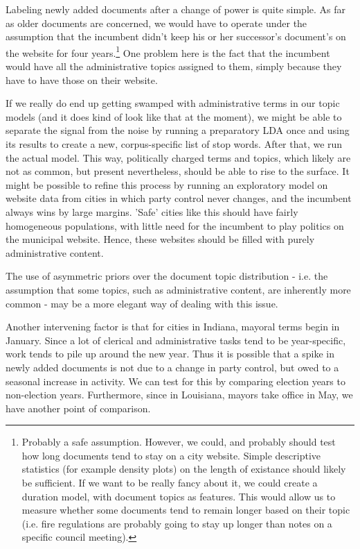 \documentclass[11pt]{article}
\begin{document}
Labeling newly added documents after a change of power is quite simple. As far as older documents are concerned, we would have to operate under the assumption that the incumbent didn't keep his or her successor's document's on the website for four years.\footnote{Probably a safe assumption. However, we could, and probably should test how long documents tend to stay on a city website. Simple descriptive statistics (for example density plots) on the length of existance should likely be sufficient. If we want to be really fancy about it, we could create a duration model, with document topics as features. This would allow us to measure whether some documents tend to remain longer based on their topic (i.e. fire regulations are probably going to stay up longer than notes on a specific council meeting).} One problem here is the fact that the incumbent would have all the administrative topics assigned to them, simply because they have to have those on their website.

If we really do end up getting swamped with administrative terms in our topic models (and it does kind of look like that at the moment), we might be able to separate the signal from the noise by running a preparatory LDA once and using its results to create a new, corpus-specific list of stop words. After that, we run the actual model. This way, politically charged terms and topics, which likely are not as common, but present nevertheless, should be able to rise to the surface. It might be possible to refine this process by running an exploratory model on website data from cities in which party control never changes, and the incumbent always wins by large margins. 'Safe' cities like this should have fairly homogeneous populations, with little need for the incumbent to play politics on the municipal website. Hence, these websites should be filled with purely administrative content.

The use of asymmetric priors \citep{Wallach2009} over the document topic distribution - i.e. the assumption that some topics, such as administrative content, are inherently more common - may be a more elegant way of dealing with this issue.

Another intervening factor is that for cities in Indiana, mayoral terms begin in January. Since a lot of clerical and administrative tasks tend to be year-specific, work tends to pile up around the new year. Thus it is possible that a spike in newly added documents is not due to a change in party control, but owed to a seasonal increase in activity. We can test for this by comparing election years to non-election years. Furthermore, since in Louisiana, mayors take office in May, we have another point of comparison.
\end{document}
